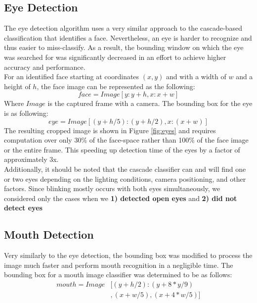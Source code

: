 \documentclass[twocolumn]{article}
\begin{document}
\subsection{Eye Detection}
The eye detection algorithm uses a very similar approach to the cascade-based classification that identifies a face. Nevertheless, an eye is harder to recognize and thus easier to miss-classify. As a result, the bounding window on which the eye was searched for was significantly decreased in an effort to achieve higher accuracy and  performance. \\
For an identified face starting at coordinates $(x,y)$ and with a width of $w$ and a height of $h$, the face image can be represented as the following:
$$face = Image[y:y+h,x:x+w]$$ Where $Image$ is the captured frame with a camera. The bounding box for the eye is as following:
$$eye = Image[(y+h/5):(y+h/2),x:(x+w)]$$
The resulting cropped image is shown in Figure \ref{fig:eyes} and requires computation over only 30\% of the face-space rather than 100\% of the face image or the entire frame. This speeding up detection time of the eyes by a factor of approximately 3x. \\
Additionally, it should be noted that the cascade classifier can and will find one or two eyes depending on the lighting conditions, camera positioning, and other factors. Since blinking mostly occurs with both eyes simultaneously, we considered only the cases when we \textbf{1) detected open eyes} and \textbf{2) did not detect eyes}

\subsection{Mouth Detection}
Very similarly to the eye detection, the bounding box was modified to process the image much faster and perform mouth recognition in a negligible time. The bounding box for a mouth image classifier was determined to be as follows:
\begin{align*}
mouth = Image &[(y+h/2):(y+8*y/9) \\
&,(x+w/5),(x+4*w/5)]
\end{align*}
\end{document}
